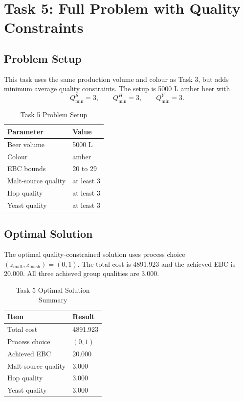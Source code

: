 \section{Task 5: Full Problem with Quality Constraints}
\label{sec:task5}

\subsection{Problem Setup}
\label{sec:task5-setup}
This task uses the same production volume and colour as Task 3, but adds minimum average quality constraints. The setup is 5000 L amber beer with
\[
Q^S_{\min}=3,\qquad Q^H_{\min}=3,\qquad Q^Y_{\min}=3.
\]

\begin{table}[!t]
\renewcommand{\arraystretch}{1.15}
\caption{Task 5 Problem Setup}
\label{tab:task35-setup}
\centering
\small
\begin{tabular}{@{}ll@{}}
\toprule
Parameter & Value \\
\midrule
Beer volume & 5000 L \\
Colour & amber \\
EBC bounds & 20 to 29 \\
Malt-source quality & at least 3 \\
Hop quality & at least 3 \\
Yeast quality & at least 3 \\
\bottomrule
\end{tabular}
\end{table}

\subsection{Optimal Solution}
\label{sec:task5-solution}
The optimal quality-constrained solution uses process choice $(z_{\mathrm{malt}},z_{\mathrm{mash}})=(0,1)$. The total cost is 4891.923 and the achieved EBC is 20.000. All three achieved group qualities are 3.000.

\begin{table}[!t]
\renewcommand{\arraystretch}{1.15}
\caption{Task 5 Optimal Solution Summary}
\label{tab:task35-solution}
\centering
\small
\begin{tabular}{@{}ll@{}}
\toprule
Item & Result \\
\midrule
Total cost & 4891.923 \\
Process choice & $(0,1)$ \\
Achieved EBC & 20.000 \\
Malt-source quality & 3.000 \\
Hop quality & 3.000 \\
Yeast quality & 3.000 \\
\bottomrule
\end{tabular}
\end{table}

